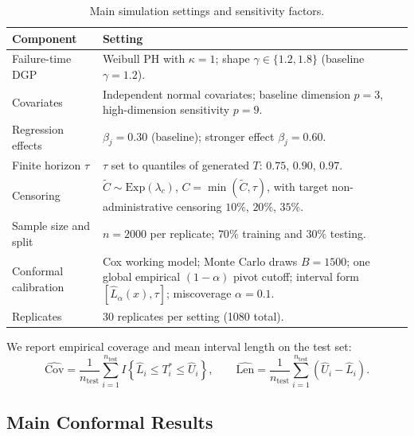 \documentclass[12pt]{article}
\makeatletter
\let\thesis@section\subsection
\let\thesis@subsection\subsubsection
\renewcommand{\section}{\thesis@section}
\renewcommand{\subsection}{\thesis@subsection}
\makeatother
\begin{document}
\begin{table}[htbp]
\centering
\caption{Main simulation settings and sensitivity factors.}
\label{tab:sim_settings}
\begin{tabular}{@{}p{}p{}@{}}
\toprule
Component & Setting \\
\midrule
Failure-time DGP & Weibull PH with $\kappa=1$; shape $\gamma\in\{1.2,1.8\}$ (baseline $\gamma=1.2$). \\
Covariates & Independent normal covariates; baseline dimension $p=3$, high-dimension sensitivity $p=9$. \\
Regression effects & $\beta_j=0.30$ (baseline); stronger effect $\beta_j=0.60$. \\
Finite horizon $\tau$ & $\tau$ set to quantiles of generated $T$: $0.75$, $0.90$, $0.97$. \\
Censoring & $\widetilde C\sim\mathrm{Exp}(\lambda_c)$, $C=\min(\widetilde C,\tau)$, with target non-administrative censoring $10\%$, $20\%$, $35\%$. \\
Sample size and split & $n=2000$ per replicate; $70\%$ training and $30\%$ testing. \\
\textcolor{revisionblue}{Conformal calibration} & \textcolor{revisionblue}{Cox working model; Monte Carlo draws $B=1500$; one global empirical $(1-\alpha)$ pivot cutoff; interval form $[\widehat L_\alpha(x),\tau]$; miscoverage $\alpha=0.1$.} \\
Replicates & 30 replicates per setting (1080 total). \\
\bottomrule
\end{tabular}
\end{table}

We report empirical coverage and mean interval length on the test set:
\[
\widehat{\mathrm{Cov}}=\frac{1}{n_{\text{test}}}\sum_{i=1}^{n_{\text{test}}}
I\!\left\{\widehat L_i\le T_i^*\le \widehat U_i\right\},\qquad
\widehat{\mathrm{Len}}=\frac{1}{n_{\text{test}}}\sum_{i=1}^{n_{\text{test}}}
(\widehat U_i-\widehat L_i).
\]

\section{\texorpdfstring{\textcolor{revisionblue}{Main Conformal Results}}{Main Conformal Results}}
\end{document}
